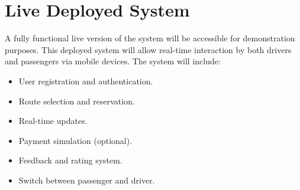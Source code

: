 \documentclass[a4paper,12pt]{article}
\begin{document}
\section{Live Deployed System}
A fully functional live version of the system will be accessible for demonstration purposes. This deployed system will allow real-time interaction by both drivers and passengers via mobile devices. The system will include:
\begin{itemize}
    \item User registration and authentication.
    \item Route selection and reservation.
    \item Real-time updates.
    \item Payment simulation (optional).
    \item Feedback and rating system.
    \item Switch between passenger and driver.
\end{itemize}
\end{document}
